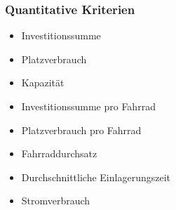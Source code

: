 \subsubsection{Quantitative Kriterien}

\begin{itemize}
  \item Investitionssumme
  \item Platzverbrauch
  \item Kapazität
  \item Investitionssumme pro Fahrrad
  \item Platzverbrauch pro Fahrrad
  \item Fahrraddurchsatz
  \item Durchschnittliche Einlagerungszeit
  \item Stromverbrauch
\end{itemize}

